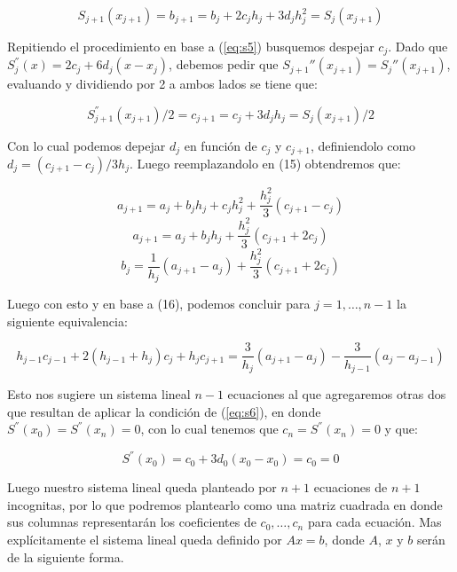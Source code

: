 \begin{equation}
	S_{j+1}(x_{j+1}) = b_{j+1} = b_j + 2c_{j}h_j + 3d_{j}h_j^2 = S_j(x_{j+1})
\end{equation}

Repitiendo el procedimiento en base a (\ref{eq:s5}) busquemos despejar $c_j$. Dado que $S_j^{''}(x) =  2c_{j} + 6d_{j}(x - x_j)$, debemos pedir que $S_{j+1}{''}(x_{j+1}) = S_{j}{''}(x_{j+1})$, evaluando y dividiendo por 2 a ambos lados se tiene que:

\begin{equation}
	S_{j+1}^{''}(x_{j+1})/2 = c_{j+1} = c_{j} + 3d_{j}h_j = S_j(x_{j+1})/2
\end{equation}

Con lo cual podemos depejar $d_j$ en función de $c_j$ y $c_{j+1}$, definiendolo como $d_j = (c_{j+1} - c_j)/3h_j$. Luego reemplazandolo en (15) obtendremos que:

\begin{equation}
	a_{j+1} =  a_{j} + b_jh_j + c_{j}h_j^2 + \frac{h_j^2}{3}(c_{j+1} - c_j)
\end{equation} 
\begin{equation}
	a_{j+1} =  a_{j} + b_jh_j + \frac{h_j^2}{3}(c_{j+1} + 2c_j)
\end{equation}
\begin{equation}
	b_j = \frac{1}{h_j}(a_{j+1} - a_{j}) + \frac{h_j^2}{3}(c_{j+1} + 2c_j)    
\end{equation}

Luego con esto y en base a (16), podemos concluir para $j = 1, \dots, n-1$ la siguiente equivalencia:

\begin{equation}
	h_{j-1}c_{j-1} + 2(h_{j-1} + h_j)c_j + h_jc_{j+1} = \frac{3}{h_j}(a_{j+1} - a_j) - \frac{3}{h_{j-1}}(a_j - a_{j-1})	  
\end{equation}
 
Esto nos sugiere un sistema lineal $n-1$ ecuaciones al que agregaremos otras dos que resultan de aplicar la condición de (\ref{eq:s6}), en donde $S^{''}(x_0) = S^{''}(x_n) = 0$, con lo cual tenemos que $c_n = S^{''}(x_{n}) = 0$ y que:

\begin{equation}
	S^{''}(x_{0}) = c_{0} + 3d_{0}(x_0 - x_0) = c_{0} = 0
\end{equation}

Luego nuestro sistema lineal queda planteado por $n+1$ ecuaciones de $n+1$ incognitas, por lo que podremos plantearlo como una matriz cuadrada en donde sus columnas representarán los coeficientes de $c_0, \dots , c_n$ para cada ecuación. Mas explícitamente el sistema lineal queda definido por $Ax = b$, donde $A$, $x$ y $b$ serán de la siguiente forma.

